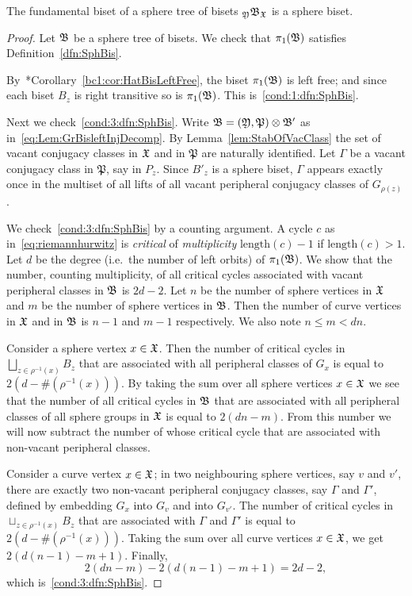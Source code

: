 \documentclass{amsart}
\begin{document}
\begin{thm}\label{thm:sphere tree gives sphere biset}
  The fundamental biset of a sphere tree of bisets
  $\subscript\gfY\gfB_\gf$ is a sphere biset.
\end{thm}
\begin{proof}
  Let ${\mathfrak B}$ be a sphere tree of bisets. We check that
  $\pi_1({\mathfrak B})$ satisfies Definition~\ref{dfn:SphBis}.

  By~\cite{bartholdi-dudko:bc1}*{Corollary~\ref{bc1:cor:HatBisLeftFree}},
  the biset $\pi_1({\mathfrak B})$ is left free; and since each biset
  $B_z$ is right transitive so is $\pi_1({\mathfrak B})$. This
  is~\eqref{cond:1:dfn:SphBis}.

  Next we check~\eqref{cond:3:dfn:SphBis}. Write
  ${\mathfrak B}= ({\mathfrak Y},\mathfrak P) \otimes {\mathfrak B}'$ as
  in~\eqref{eq:Lem:GrBisleftInjDecomp}. By
  Lemma~\ref{lem:StabOfVacClass} the set of vacant conjugacy classes
  in ${\mathfrak X}$ and in $\mathfrak P$ are naturally identified. Let $\Gamma$
  be a vacant conjugacy class in $\mathfrak P$, say in $P_z$. Since
  $B'_z$ is a sphere biset, $\Gamma$ appears exactly once in the
  multiset of all lifts of all vacant peripheral conjugacy classes of
  $G_{\rho(z)}$.

  We check~\eqref{cond:3:dfn:SphBis} by a counting argument. A cycle
  $c$ as in~\eqref{eq:riemannhurwitz} is \emph{critical} of
  \emph{multiplicity} $\text{length}(c)-1$ if
  $\text{length}(c)>1$. Let $d$ be the degree (i.e.\ the number of
  left orbits) of $\pi_1({\mathfrak B})$. We show that the number,
  counting multiplicity, of all critical cycles associated with vacant
  peripheral classes in ${\mathfrak B}$ is $2d-2$. Let $n$ be the number
  of sphere vertices in ${\mathfrak X}$ and $m$ be the number of sphere vertices
  in ${\mathfrak B}$. Then the number of curve vertices in ${\mathfrak X}$ and in
  ${\mathfrak B}$ is $n-1$ and $m-1$ respectively. We also note
  $n\le m< d n$.

  Consider a sphere vertex $x\in {\mathfrak X}$. Then the number of critical
  cycles in $\bigsqcup_{z\in \rho^{-1}(x)}B_z$ that are associated with
  all peripheral classes of $G_x$ is equal to
  $2 (d- \#(\rho^{-1}(x)))$. By taking the sum over all sphere
  vertices $x\in {\mathfrak X}$ we see that the number of all critical cycles in
  ${\mathfrak B}$ that are associated with all peripheral classes of all
  sphere groups in ${\mathfrak X}$ is equal to $2(d n-m)$. From this number we
  will now subtract the number of whose critical cycle that are
  associated with non-vacant peripheral classes.

  Consider a curve vertex $x\in {\mathfrak X}$; in two neighbouring sphere
  vertices, say $v$ and $v'$, there are exactly two non-vacant
  peripheral conjugacy classes, say $\Gamma$ and $\Gamma'$, defined by
  embedding $G_x$ into $G_v$ and into $G_{v'}$. The number of critical
  cycles in $\sqcup_{z\in \rho^{-1}(x)}B_z$ that are associated with
  $\Gamma$ and $\Gamma'$ is equal to $2 (d- \#(\rho^{-1}(x)))$. Taking
  the sum over all curve vertices $x\in {\mathfrak X}$, we get
  $2(d(n-1)-m+1)$. Finally,
  \[2(d n-m) -2(d(n-1)-m+1) = 2d-2,\] 
  which is~\eqref{cond:3:dfn:SphBis}.
\end{proof}
\end{document}

